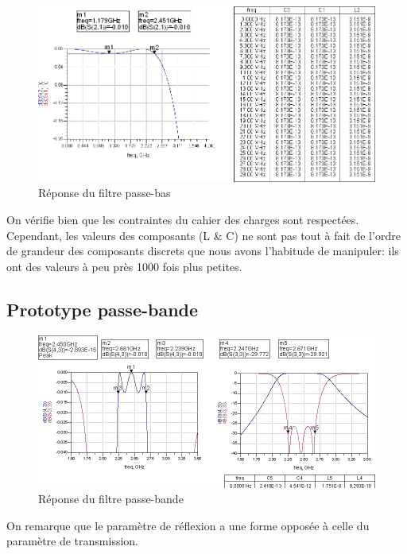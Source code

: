 \documentclass[10pt]{article}
\begin{document}
\begin{figure}
    \begin{center}
        \includegraphics[width=15cm]{p17_simu}
    \end{center}
    \caption{Réponse du filtre passe-bas}
\end{figure}

On vérifie bien que les contraintes du cahier des charges sont respectées. Cependant, les valeurs des
composants (L \& C) ne sont pas tout à fait de l’ordre de grandeur des composants discrets que nous 
avons l’habitude de manipuler: ils ont des valeurs à peu près 1000 fois plus petites.

\subsection{Prototype passe-bande}

\begin{figure}
    \begin{center}
        \includegraphics[width=15cm]{P17_simu_BP}
    \end{center}
    \caption{Réponse du filtre passe-bande}
\end{figure}

On remarque que le paramètre de réflexion a une forme opposée à celle du paramètre de transmission.
\end{document}
